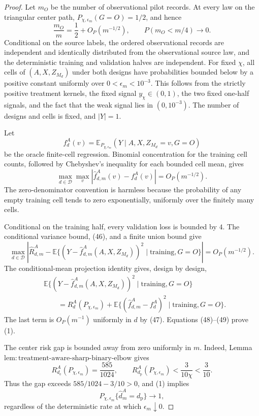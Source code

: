 \documentclass{article}
\begin{document}
\begin{proof}
Let \(m_O\) be the number of observational pilot records.  At every law on the triangular center path, \(P_{\chi,\epsilon_m}(G=O)=1/2\), and hence
\[
 \frac{m_O}{m}=\frac12+O_P(m^{-1/2}),
 \qquad P(m_O<m/4)\longrightarrow0.                       \tag{46}
\]
Conditional on the source labels, the ordered observational records are independent and identically distributed from the observational source law, and the deterministic training and validation halves are independent.  For fixed \(\chi\), all cells of \((A,X,Z_{M_d})\) under both designs have probabilities bounded below by a positive constant uniformly over \(0<\epsilon_m<10^{-3}\).  This follows from the strictly positive treatment kernels, the fixed signal \(y_\chi\in(0,1)\), the two fixed one-half signals, and the fact that the weak signal lies in \((0,10^{-3})\).  The number of designs and cells is fixed, and \(|Y|=1\).

Let
\[
 f_d^A(v)=\mathbb E_{P_{\chi,\epsilon_m}}(Y\mid A,X,Z_{M_d}=v,G=O)
\]
be the oracle finite-cell regression.  Binomial concentration for the training cell counts, followed by Chebyshev's inequality for each bounded cell mean, gives
\[
 \max_{d\in\mathcal D}\max_v
 |\widehat f_{d,m}^A(v)-f_d^A(v)|=O_P(m^{-1/2}).            \tag{47}
\]
The zero-denominator convention is harmless because the probability of any empty training cell tends to zero exponentially, uniformly over the finitely many cells.

Conditional on the training half, every validation loss is bounded by \(4\).  The conditional variance bound, (46), and a finite union bound give
\[
 \max_{d\in\mathcal D}\left|
 \widehat R_{d,m}^A-
 \mathbb E\{(Y-\widehat f_{d,m}^A(A,X,Z_{M_d}))^2
 \mid\text{training},G=O\}
 \right|=O_P(m^{-1/2}).                                   \tag{48}
\]
The conditional-mean projection identity gives, design by design,
\[
\begin{aligned}
 &\mathbb E\{(Y-\widehat f_{d,m}^A(A,X,Z_{M_d}))^2
 \mid\text{training},G=O\}\\
 &\qquad=R_d^A(P_{\chi,\epsilon_m})
 +\mathbb E\{(\widehat f_{d,m}^A-f_d^A)^2
 \mid\text{training},G=O\}.
\end{aligned}                                               \tag{49}
\]
The last term is \(O_P(m^{-1})\) uniformly in \(d\) by (47).  Equations (48)--(49) prove (1).

The center risk gap is bounded away from zero uniformly in \(m\).  Indeed, Lemma~\(\mathrm{lem{:}treatment\text{-}aware\text{-}sharp\text{-}binary\text{-}elbow}\) gives
\[
 R_{d_{\mathrm e}}^A(P_{\chi,\epsilon_m})
 =\frac{585}{1024},
 \qquad
 R_{d_{\mathrm p}}^A(P_{\chi,\epsilon_m})
 <\frac3{10\chi}<\frac3{10}.
\]
Thus the gap exceeds \(585/1024-3/10>0\), and (1) implies
\[
 P_{\chi,\epsilon_m}\{\widehat d_m^A=d_{\mathrm p}\}\longrightarrow1,
\]
regardless of the deterministic rate at which \(\epsilon_m\downarrow0\).


\end{proof}
\end{document}
